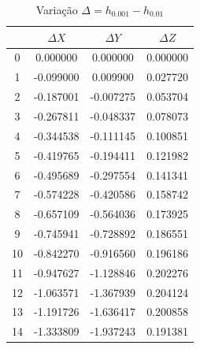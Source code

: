 \documentclass[12pt, a4paper]{article}
\begin{document}
    \begin{table}[H]
        \centering
        \footnotesize
        \begin{tabular}{|c|c|c|c|}
        \toprule
         & $\Delta X$ & $\Delta Y$ & $\Delta Z$ \\
        \midrule
        0 & 0.000000 & 0.000000 & 0.000000 \\
        1 & -0.099000 & 0.009900 & 0.027720 \\
        2 & -0.187001 & -0.007275 & 0.053704 \\
        3 & -0.267811 & -0.048337 & 0.078073 \\
        4 & -0.344538 & -0.111145 & 0.100851 \\
        5 & -0.419765 & -0.194411 & 0.121982 \\
        6 & -0.495689 & -0.297554 & 0.141341 \\
        7 & -0.574228 & -0.420586 & 0.158742 \\
        8 & -0.657109 & -0.564036 & 0.173925 \\
        9 & -0.745941 & -0.728892 & 0.186551 \\
        10 & -0.842270 & -0.916560 & 0.196186 \\
        11 & -0.947627 & -1.128846 & 0.202276 \\
        12 & -1.063571 & -1.367939 & 0.204124 \\
        13 & -1.191726 & -1.636417 & 0.200858 \\
        14 & -1.333809 & -1.937243 & 0.191381 \\
        \bottomrule
        \end{tabular}
        \caption{Variação $\Delta = h_{0.001} - h_{0.01}$}
    \end{table}
    
\end{document}
